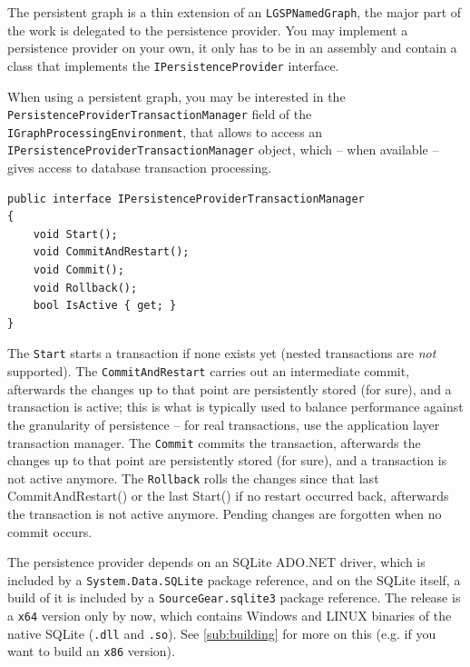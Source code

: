 The persistent graph is a thin extension of an \texttt{LGSPNamedGraph}, the major part of the work is delegated to the persistence provider.
You may implement a persistence provider on your own, it only has to be in an assembly and contain a class that implements the \texttt{IPersistenceProvider} interface.

When using a persistent graph, you may be interested in the \texttt{Persistence\-Provider\-Transaction\-Manager} field of the \texttt{IGraph\-Processing\-Environment}, that allows to access an \texttt{IPersistence\-Provider\-Transaction\-Manager} object, which -- when available -- gives access to database transaction processing.

\begin{example}\label{ex:pptransman}
\begin{verbatim}
public interface IPersistenceProviderTransactionManager
{
    void Start();
    void CommitAndRestart();
    void Commit();
    void Rollback();
    bool IsActive { get; }
}
\end{verbatim}
\end{example}

The \texttt{Start} starts a transaction if none exists yet (nested transactions are \emph{not} supported).
The \texttt{CommitAndRestart} carries out an intermediate commit, afterwards the changes up to that point are persistently stored (for sure), and a transaction is active; this is what is typically used to balance performance against the granularity of persistence -- for real transactions, use the application layer transaction manager.
The \texttt{Commit} commits the transaction, afterwards the changes up to that point are persistently stored (for sure), and a transaction is not active anymore.
The \texttt{Rollback} rolls the changes since that last CommitAndRestart() or the last Start() if no restart occurred back, afterwards the transaction is not active anymore. Pending changes are forgotten when no commit occurs.

The persistence provider depends on an SQLite ADO.NET driver, which is included by a \texttt{System.Data.SQLite} package reference, and on the SQLite itself, a build of it is included by a \texttt{SourceGear.sqlite3} package reference.
The release is a \texttt{x64} version only by now, which contains Windows and LINUX binaries of the native SQLite (\texttt{.dll} and \texttt{.so}).
See \ref{sub:building} for more on this (e.g. if you want to build an \texttt{x86} version).


